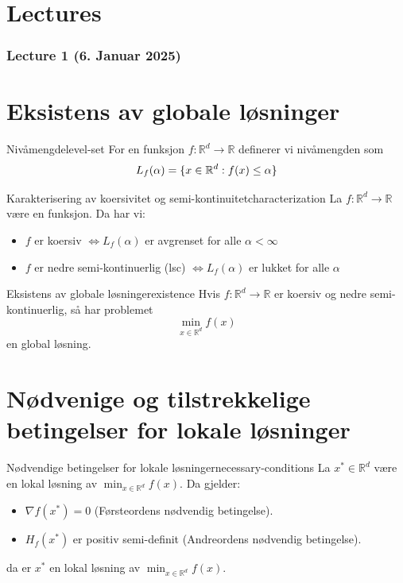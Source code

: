 \section{Lectures}

\subsubsection{Lecture 1 (6. Januar 2025)}

\section*{Eksistens av globale løsninger}

\begin{definition}{Nivåmengde}{level-set}
  For en funksjon $f: \mathbb{R}^d \to \mathbb{R}$ definerer vi nivåmengden som
  \[
    L_f(\alpha) = \{x \in \mathbb{R}^d : f(x) \leq \alpha\}
  \]
\end{definition}

\begin{theorem}{Karakterisering av koersivitet og semi-kontinuitet}{characterization}
  La $f: \mathbb{R}^d \to \mathbb{R}$ være en funksjon. Da har vi:
  \begin{itemize}
    \item $f$ er koersiv $\iff L_f(\alpha)$ er avgrenset for alle $\alpha < \infty$
    \item $f$ er nedre semi-kontinuerlig (lsc) $\iff L_f(\alpha)$ er lukket for alle $\alpha$
  \end{itemize}
\end{theorem}

\begin{theorem}{Eksistens av globale løsninger}{existence}
  Hvis $f: \mathbb{R}^d \to \mathbb{R}$ er koersiv og nedre semi-kontinuerlig, så har problemet
  \[
    \min_{x \in \mathbb{R}^d} f(x)
  \]
  en global løsning.
\end{theorem}

\section*{Nødvenige og tilstrekkelige betingelser for lokale løsninger}

\begin{theorem}{Nødvendige betingelser for lokale løsninger}{necessary-conditions}
  La $x^* \in \mathbb{R}^d$ være en lokal løsning av $\min_{x \in \mathbb{R}^d} f(x)$. Da gjelder:
  \begin{itemize}
    \item $\nabla f(x^*) = 0$ (Førsteordens nødvendig betingelse).
    \item $H_f(x^*)$ er positiv semi-definit (Andreordens nødvendig betingelse).
  \end{itemize}
  da er $x^*$ en lokal løsning av $\min_{x \in \mathbb{R}^d} f(x)$.
\end{theorem}\label{thm:necessary-conditions}

